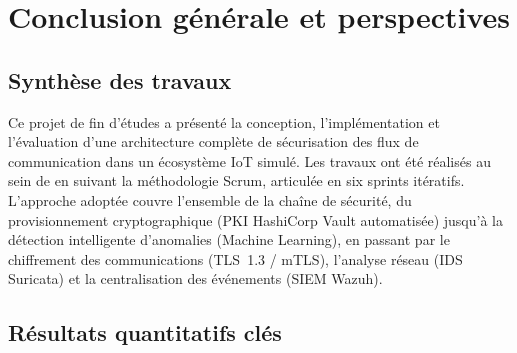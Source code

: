 \chapter*{Conclusion générale et perspectives}

\section*{Synthèse des travaux}

Ce projet de fin d'études a présenté la conception, l'implémentation et l'évaluation d'une architecture complète de sécurisation des flux de communication dans un écosystème IoT simulé. Les travaux ont été réalisés au sein de \TT{} en suivant la méthodologie Scrum, articulée en six sprints itératifs. L'approche adoptée couvre l'ensemble de la chaîne de sécurité, du provisionnement cryptographique (PKI HashiCorp Vault automatisée) jusqu'à la détection intelligente d'anomalies (Machine Learning), en passant par le chiffrement des communications (TLS~1.3 / mTLS), l'analyse réseau (IDS Suricata) et la centralisation des événements (SIEM Wazuh).

\section*{Résultats quantitatifs clés}

